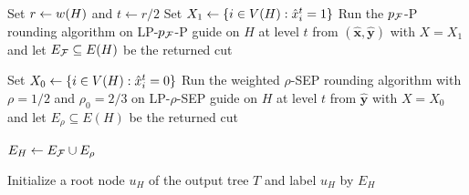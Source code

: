 \begin{algorithm}[H]
\caption{Recursive \textsc{HC-$\cF$} Procedure}
\label{alg:recursive-procedure}
\label{alg:recursive-hac}
\DontPrintSemicolon
{}
Set $r\gets w\mathopen{}\left( H \right)$ and $t\gets r/2$\;
Set $X_1\gets \mathopen{}\left\{ i\in V\mathopen{}\left( H \right): \hat{x}_i^t = 1 \right\}$\;
Run the \textsc{$p_{\mathcal{F}}$-P} rounding algorithm on \textsc{LP-$p_{\mathcal{F}}$-P} guide on $H$ at level $t$ from $(\hat{\mathbf{x}},\hat{\mathbf{y}})$ with $X=X_1$ and let $E_{\mathcal{F}}\subseteq E(H)$ be the returned cut\;

Set $X_0\gets \mathopen{}\left\{ i\in V\mathopen{}\left( H \right): \hat{x}_i^t = 0 \right\}$\;
Run the weighted \textsc{$\rho$-SEP} rounding algorithm with $\rho=1/2$ and $\rho_0=2/3$ on \textsc{LP-$\rho$-SEP} guide on $H$ at level $t$ from $\hat{\mathbf{y}}$ with $X=X_0$ and let $E_{\rho}\subseteq E(H)$ be the returned cut\;

$E_H\gets E_{\mathcal{F}}\cup E_{\rho}$\;

Initialize a root node $u_H$ of the output tree $T$ and label $u_H$ by $E_H$\;
\end{algorithm}
